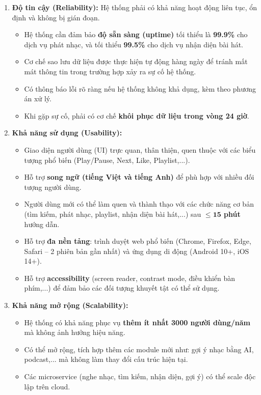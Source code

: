 \begin{enumerate}
    \item \textbf{Độ tin cậy (Reliability):} Hệ thống phải có khả năng hoạt động liên tục, ổn định và không bị gián đoạn.
    \begin{itemize}
        \item Hệ thống cần đảm bảo \textbf{độ sẵn sàng (uptime)} tối thiểu là \textbf{99.9\%} cho dịch vụ phát nhạc, và tối thiểu \textbf{99.5\%} cho dịch vụ nhận diện bài hát.
        \item Cơ chế sao lưu dữ liệu được thực hiện tự động hàng ngày để tránh mất mát thông tin trong trường hợp xảy ra sự cố hệ thống.
        \item Có thông báo lỗi rõ ràng nếu hệ thống không khả dụng, kèm theo phương án xử lý.
        \item Khi gặp sự cố, phải có cơ chế \textbf{khôi phục dữ liệu trong vòng 24 giờ}.
    \end{itemize}

    \item \textbf{Khả năng sử dụng (Usability):}
    \begin{itemize}
        \item Giao diện người dùng (UI) trực quan, thân thiện, quen thuộc với các biểu tượng phổ biến (Play/Pause, Next, Like, Playlist,...).
        \item Hỗ trợ \textbf{song ngữ (tiếng Việt và tiếng Anh)} để phù hợp với nhiều đối tượng người dùng.
        \item Người dùng mới có thể làm quen và thành thạo với các chức năng cơ bản (tìm kiếm, phát nhạc, playlist, nhận diện bài hát,...) sau \textbf{$\leq \mathbf{15}$ phút} hướng dẫn.
        \item Hỗ trợ \textbf{đa nền tảng}: trình duyệt web phổ biến (Chrome, Firefox, Edge, Safari – 2 phiên bản gần nhất) và ứng dụng di động (Android 10+, iOS 14+).
        \item Hỗ trợ \textbf{accessibility} (screen reader, contrast mode, điều khiển bàn phím,...) để đảm bảo các đối tượng khuyết tật có thể sử dụng.
    \end{itemize}

    \item \textbf{Khả năng mở rộng (Scalability):}
    \begin{itemize}
        \item Hệ thống có khả năng phục vụ \textbf{thêm ít nhất 3000 người dùng/năm} mà không ảnh hưởng hiệu năng.
        \item Có thể mở rộng, tích hợp thêm các module mới như: gợi ý nhạc bằng AI, podcast,... mà không làm thay đổi cấu trúc hiện tại.
        \item Các microservice (nghe nhạc, tìm kiếm, nhận diện, gợi ý) có thể scale độc lập trên cloud.
    \end{itemize}


\end{enumerate}
